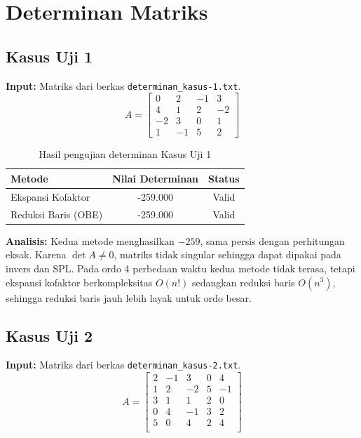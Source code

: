 \documentclass[12pt,a4paper]{report}
\begin{document}
\section{Determinan Matriks}  
 
\subsection{Kasus Uji 1}
\textbf{Input:} Matriks dari berkas \texttt{determinan\_kasus-1.txt}.
\[
A = \begin{bmatrix}
     0 &  2 &  -1 & 3 \\
    4 & 1 & 2 & -2 \\
    -2 & 3 & 0 & 1 \\
    1 & -1 & 5 & 2
\end{bmatrix}
\]
 
\begin{table}[H]
    \centering
    \caption{Hasil pengujian determinan Kasus Uji 1}
    \begin{tabular}{|l|c|c|}
        \hline
        \textbf{Metode} & \textbf{Nilai Determinan} & \textbf{Status} \\
        \hline
        Ekspansi Kofaktor & -259.000 & Valid \\
        Reduksi Baris (OBE) & -259.000 & Valid \\
        \hline
    \end{tabular}
\end{table}
 
\textbf{Analisis:}  Kedua metode menghasilkan $-259$, sama persis dengan perhitungan eksak. Karena $\det A \neq 0$, matriks tidak singular sehingga dapat dipakai pada invers dan SPL. Pada ordo 4 perbedaan waktu kedua metode tidak terasa, tetapi ekspansi kofaktor berkompleksitas $O(n!)$ sedangkan reduksi baris $O(n^3)$, sehingga reduksi baris jauh lebih layak untuk ordo besar.

\subsection{Kasus Uji 2}
\textbf{Input:} Matriks dari berkas \texttt{determinan\_kasus-2.txt}.
\[
A = \begin{bmatrix}
    2 &-1&3 &0 &4 \\
    1 &2 &-2 &5 &-1 \\ 
    3 &1 &1 &2 &0 \\ 
    0 &4 &-1 &3 &2 \\ 
    5 &0 &4 &2 &4 \\ 
\end{bmatrix}
\]
 
\end{document}
